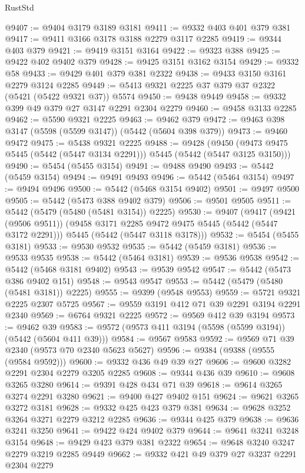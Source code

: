 \begin{lexlean}{RustStd}
\begin{coremodule}
{\begin{coremodule}
{{{{{{{{{{{{@9407 := @9404 @3179 @3189 @3181
@9411 := @9332 @403 @401 @379 @381
@9417 := @9411 @3166 @3178 @3188 @2279 @3117 @2285
@9419 := @9344 @403 @379
@9421 := @9419 @3151 @3164
@9422 := @9323 @388
@9425 := @9422 @402 @9402 @379
@9428 := @9425 @3151 @3162 @3154
@9429 := @9332 @58
@9433 := @9429 @401 @379 @381 @2322
@9438 := @9433 @3150 @3161 @2279 @3124 @2285
@9449 := @5413 @9321 @2225 @37 @379 @37 @2322 (@5421 (@5422 @9321 @37)) @5574
@9450 := @9438 @9449
@9458 := @9332 @399 @49 @379 @27 @3147 @2291 @2304 @2279
@9460 := @9458 @3133 @2285
@9462 := @5590 @9321 @2225
@9463 := @9462 @379
@9472 := @9463 @398 @3147 (@5598 (@5599 @3147)) (@5442 (@5604 @398 @379))
@9473 := @9460 @9472
@9475 := @5438 @9321 @2225
@9488 := @9428
    (@9450 (@9473 @9475 @5445 (@5442 (@5447 @3134 @2291))) @5445 (@5442 (@5447 @3125 @3150)))
@9490 := @5454 (@5455 @3154)
@9491 := @9488 @9490
@9493 := @5442 (@5459 @3154)
@9494 := @9491 @9493
@9496 := @5442 (@5464 @3154)
@9497 := @9494 @9496
@9500 := @5442 (@5468 @3154 @9402)
@9501 := @9497 @9500
@9505 := @5442 (@5473 @388 @9402 @379)
@9506 := @9501 @9505
@9511 := @5442 (@5479 (@5480 (@5481 @3154)) @2225)
@9530 := @9407
    (@9417
      (@9421 (@9506 @9511))
      (@9458 @3171 @2285 @9472 @9475 @5445 (@5442 (@5447 @3172 @2291)))
      @5445
      (@5442 (@5447 @3118 @3178)))
@9532 := @5454 (@5455 @3181)
@9533 := @9530 @9532
@9535 := @5442 (@5459 @3181)
@9536 := @9533 @9535
@9538 := @5442 (@5464 @3181)
@9539 := @9536 @9538
@9542 := @5442 (@5468 @3181 @9402)
@9543 := @9539 @9542
@9547 := @5442 (@5473 @386 @9402 @151)
@9548 := @9543 @9547
@9553 := @5442 (@5479 (@5480 (@5481 @3181)) @2225)
@9555 := @9399 (@9548 @9553)
@9559 := @5721 @9321 @2225 @2307 @5725
@9567 := @9559 @3191 @412 @71 @39 @2291 @3194 @2291 @2340
@9569 := @6764 @9321 @2225
@9572 := @9569 @412 @39 @3194
@9573 := @9462 @39
@9583 := @9572 (@9573 @411 @3194 (@5598 (@5599 @3194)) (@5442 (@5604 @411 @39)))
@9584 := @9567 @9583
@9592 := @9569 @71 @39 @2340 (@9573 @70 @2340 @5623 @5627)
@9596 := @9384 (@9388 (@9555 (@9584 @9592)))
@9600 := @9332 @436 @49 @39 @27
@9606 := @9600 @3282 @2291 @2304 @2279 @3205 @2285
@9608 := @9344 @436 @39
@9610 := @9608 @3265 @3280
@9614 := @9391 @428 @434 @71 @39
@9618 := @9614 @3265 @3274 @2291 @3280
@9621 := @9400 @427 @9402 @151
@9624 := @9621 @3265 @3272 @3181
@9628 := @9332 @425 @423 @379 @381
@9634 := @9628 @3252 @3264 @3271 @2279 @3212 @2285
@9636 := @9344 @425 @379
@9638 := @9636 @3241 @3250
@9641 := @9422 @424 @9402 @379
@9644 := @9641 @3241 @3248 @3154
@9648 := @9429 @423 @379 @381 @2322
@9654 := @9648 @3240 @3247 @2279 @3219 @2285 @9449
@9662 := @9332 @421 @49 @379 @27 @3237 @2291 @2304 @2279
}}}}}}}}}}}}
\end{coremodule}}
\end{coremodule}
\end{lexlean}
